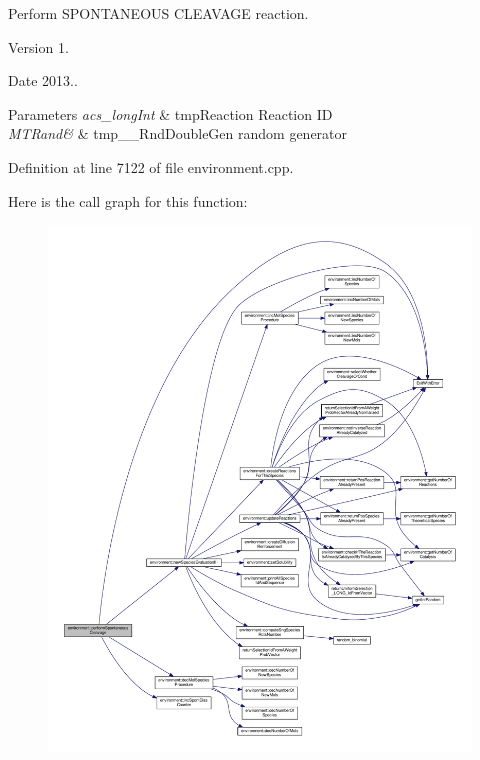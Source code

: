 Perform S\-P\-O\-N\-T\-A\-N\-E\-O\-U\-S C\-L\-E\-A\-V\-A\-G\-E reaction. 

\begin{DoxyVersion}{Version}
1. 
\end{DoxyVersion}
\begin{DoxyDate}{Date}
2013.. 
\end{DoxyDate}

\begin{DoxyParams}{Parameters}
{\em acs\-\_\-long\-Int} & tmp\-Reaction Reaction I\-D \\
\hline
{\em M\-T\-Rand\&} & tmp\-\_\-\-\_\-\-Rnd\-Double\-Gen random generator \\
\hline
\end{DoxyParams}


Definition at line 7122 of file environment.\-cpp.



Here is the call graph for this function\-:\nopagebreak
\begin{figure}[H]
\begin{center}
\leavevmode
\includegraphics[width=350pt]{a00011_a4949138a3771b7f6ec2bfe82cbad947e_cgraph}
\end{center}
\end{figure}




